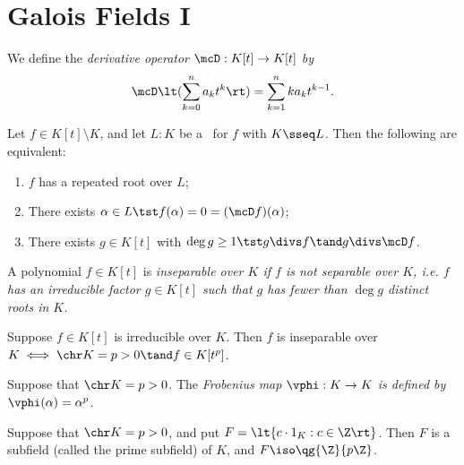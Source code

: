 \documentclass{article}
\begin{document}
\section{Galois Fields I}
\begin{tdefinition}
  We define the \it{derivative operator} \( \mcD:K[t]\to K[t] \) by \begin{align*}
    \mcD\lt(\sum_{k=0}^{n}a_kt^k\rt) = \sum_{k=1}^{n}ka_kt^{k-1}.
  \end{align*}
\end{tdefinition}

\begin{ttheorem}
  Let \( f\in K[t]\setminus K \), and let \( L:K \) be a \sfe~for \( f \) with \( K\sseq L \).
  Then the following are equivalent: \begin{enumerate}[label=(\roman*)]
    \item \( f \) has a repeated root over \( L \);
    \item There exists \( \alpha\in L \tst f(\alpha)=0=(\mcD f)(\alpha) \);
    \item There exists \( g\in K[t] \) with \( \deg g \geq 1 \tst g \divs f \tand g\divs\mcD f \).
  \end{enumerate}
\end{ttheorem}

\begin{tdefinition}[Inseparable]
  A polynomial \( f \in K[t] \) is \it{inseparable over \( K \)} if \( f \) is not separable over \( K \), i.e. \( f \) has an irreducible factor \( g \in K[t] \) such that \( g \) has fewer than \( \deg g \) distinct roots in \( K \).
\end{tdefinition}

\begin{ttheorem}
  Suppose \( f\in K[t] \) is irreducible over \( K \).
  Then \( f \) is inseparable over \( K \iff \chr K=p>0 \tand f \in K[t^p]\).
\end{ttheorem}

\begin{tdefinition}
  Suppose that \( \chr K = p > 0 \).
  The \it{Frobenius map} \( \vphi:K\to K \) is defined by \( \vphi(\alpha)=\alpha^p \).
\end{tdefinition}

\begin{ttheorem}
  Suppose that \( \chr K = p > 0 \), and put \( F=\lt\{ c\cdot 1_K : c\in \Z \rt\} \).
  Then \( F \) is a subfield (called the prime subfield) of \( K \), and \( F\iso \qg{\Z}{p\Z} \).
\end{ttheorem}
\end{document}
